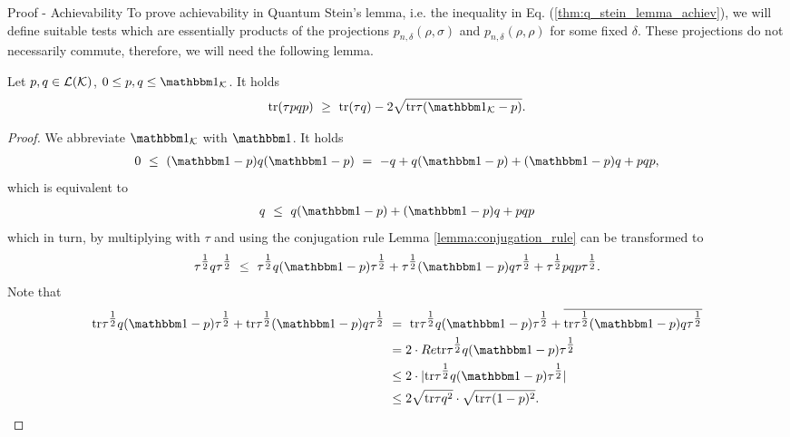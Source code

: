   \begin{subsection}{Proof - Achievability}
  To prove achievability in Quantum Stein's lemma, i.e. the inequality in Eq. (\ref{thm:q_stein_lemma_achiev}), we will define suitable tests which are essentially products of the projections $p_{n,\delta}(\rho, \sigma)$ 
  and $p_{n,\delta}(\rho,\rho)$ for some fixed $\delta$. These projections do not necessarily commute, therefore, we will need the following lemma. 
  \begin{lemma} \label{lemma:quantum_stein_matrix_ineq_1}
  Let $p,q \in {\mathcal L}({\mathcal K})$, $0 \leq p,q \leq \bbmeins_\cK$. It holds
  \begin{align*}
   \tr(\tau pqp) \ \geq \ \tr(\tau q) - 2 \sqrt{\tr \tau (\bbmeins_\cK - p)} .
  \end{align*}
  \end{lemma}
  \begin{proof}
   We abbreviate $\bbmeins_\cK$ with $\bbmeins$. It holds 
   \begin{align*}
    0 \ \leq \ (\bbmeins -p) q (\bbmeins - p) \ = \ -q + q(\bbmeins -p) + (\bbmeins - p)q + pqp,
   \end{align*}
   which is equivalent to 
   \begin{align*}
    q \ \leq \ q(\bbmeins -p) + (\bbmeins - p) q + pqp
   \end{align*}
   which in turn, by multiplying with $\tau$ and using the conjugation rule Lemma \ref{lemma:conjugation_rule} can be transformed to 
   \begin{align*}
    \tau^{\tfrac{1}{2}} q \tau^{\tfrac{1}{2}} \ \leq \ \tau^{\tfrac{1}{2}} q(\bbmeins -p) \tau^{\tfrac{1}{2}} + \tau^{\tfrac{1}{2}} (\bbmeins - p)q \tau^{\tfrac{1}{2}} + \tau^{\tfrac{1}{2}} pqp \tau^{\tfrac{1}{2}}.
   \end{align*}
   Note that
   \begin{align*}
    \tr \tau^{\tfrac{1}{2}} q (\bbmeins - p) \tau^{\tfrac{1}{2}} + \tr \tau^{\tfrac{1}{2}} (\bbmeins - p)q \tau^{\tfrac{1}{2}} \ 
     &= \ \tr \tau^{\tfrac{1}{2}} q (\bbmeins - p) \tau^{\tfrac{1}{2}} + \overline{\tr \tau^{\tfrac{1}{2}} (\bbmeins - p)q \tau^{\tfrac{1}{2}}} \\
     &= 2 \cdot Re \tr \tau^{\tfrac{1}{2}} q (\bbmeins - p) \tau^{\tfrac{1}{2}} \\
     &\leq 2 \cdot | \tr \tau^{\tfrac{1}{2}} q (\bbmeins - p) \tau^{\tfrac{1}{2}}| \\
     &\leq 2 \sqrt{\tr \tau q^2} \cdot \sqrt{\tr \tau (1-p)^2 }.
    \end{align*}

\end{proof}
\end{subsection}

